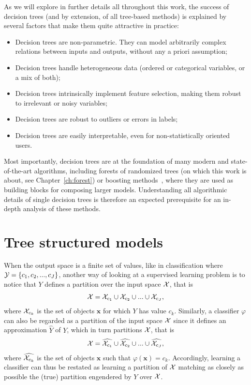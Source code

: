 As we will explore in further details all throughout this work, the success
of decision trees (and by extension, of all tree-based methods) is explained
by several factors that make them quite attractive in practice:
\begin{itemize}
\item Decision trees are non-parametric. They can model arbitrarily complex relations between inputs and outputs, without any a priori assumption;
\item Decision trees handle heterogeneous data (ordered or categorical variables, or a mix of both);
\item Decision trees intrinsically implement feature selection, making them robust to irrelevant or noisy variables;
\item Decision trees are robust to outliers or errors in labels;
\item Decision trees are easily interpretable, even for non-statistically oriented users.
\end{itemize}

Most importantly, decision trees are at the foundation of
many modern and state-of-the-art algorithms, including forests of randomized
trees (on which this work is about, see Chapter~\ref{ch:forest}) or
boosting methods~\citep{freund:1995,friedman:2001}, where they are used
as building blocks for composing larger models. Understanding all algorithmic
details of single decision trees is therefore an expected prerequisite
for an in-depth analysis of these methods.


\section{Tree structured models}
\label{sec:3:tree-structured-models}

When the output space is a finite set of values, like in classification where
${\cal Y} = \{c_1, c_2, ..., c_J\}$, another way of looking at a supervised
learning problem is to notice that $Y$ defines a partition over the input space ${\cal X}$, that
is
\begin{equation}
{\cal X} = {\cal X}_{c_1} \cup {\cal X}_{c_2} \cup ... \cup {\cal X}_{c_J},
\end{equation}
where ${\cal X}_{c_k}$ is the set of objects $\mathbf{x}$ for which
$Y$ has value $c_k$. Similarly, a classifier $\varphi$ can also be
regarded as a partition of the input space
${\cal X}$ since it defines an approximation $\widehat{Y}$ of $Y$, which in
turn partitions ${\cal X}$, that is
\begin{equation}\label{eqn:3:partition}
{\cal X} = \widehat{{\cal X}_{c_1}} \cup \widehat{{\cal X}_{c_2}} \cup ... \cup \widehat{{\cal X}_{c_J}},
\end{equation}
where
$\widehat{{\cal X}_{c_k}}$ is the set of objects $\mathbf{x}$ such that
$\varphi(\mathbf{x}) = c_k$. Accordingly, learning a classifier can thus
be restated as learning a partition of ${\cal X}$ matching as closely as
possible the (true) partition engendered by $Y$ over ${\cal X}$.


